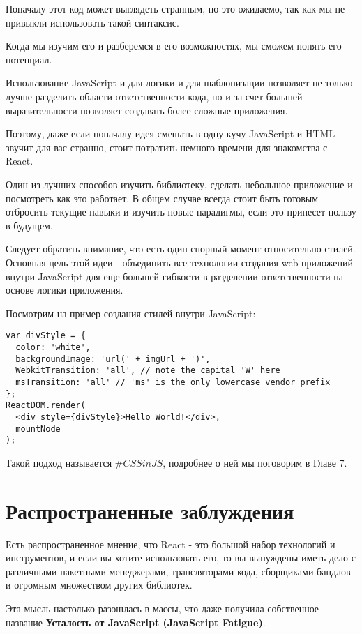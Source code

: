 Поначалу этот код может выглядеть странным, но это ожидаемо, так как мы не привыкли использовать такой синтаксис.

Когда мы изучим его и разберемся в его возможностях, мы сможем понять его потенциал.

Использование JavaScript и для логики и для шаблонизации позволяет не только лучше разделить области ответственности кода, но и за счет большей выразительности позволяет создавать более сложные приложения.

Поэтому, даже если поначалу идея смешать в одну кучу JavaScript и HTML звучит для вас странно, стоит потратить немного времени для знакомства с React.

Один из лучших способов изучить библиотеку, сделать небольшое приложение и посмотреть как это работает. В общем случае всегда стоит быть готовым отбросить текущие навыки и изучить новые парадигмы, если это принесет пользу в будущем.

Следует обратить внимание, что есть один спорный момент относительно стилей. Основная цель этой идеи - объединить все технологии создания web приложений внутри JavaScript для еще большей гибкости в разделении ответственности на основе логики приложения.

Посмотрим на пример создания стилей внутри JavaScript:

\begin{lstlisting}
var divStyle = {
  color: 'white',
  backgroundImage: 'url(' + imgUrl + ')',
  WebkitTransition: 'all', // note the capital 'W' here
  msTransition: 'all' // 'ms' is the only lowercase vendor prefix
};
ReactDOM.render(
  <div style={divStyle}>Hello World!</div>,
  mountNode
);
\end{lstlisting}

Такой подход называется $\#CSSinJS$, подробнее о ней мы поговорим в Главе 7.

\section{Распространенные заблуждения}

Есть распространенное мнение, что React - это большой набор технологий и инструментов, и если вы хотите использовать его, то вы вынуждены иметь дело с различными пакетными менеджерами, трансляторами кода, сборщиками бандлов и огромным множеством других библиотек.

Эта мысль настолько разошлась в массы, что даже получила собственное название \textbf{Усталость от JavaScript (JavaScript Fatigue)}.

